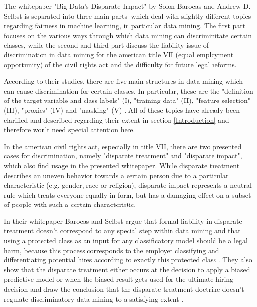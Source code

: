 The whitepaper "Big Data’s Disparate Impact" \cite{Barocas.2016} by Solon Barocas and 
Andrew D. Selbst is separated into three main parts, which deal with slightly different 
topics regarding fairness in machine learning, in particular data mining. The first part 
focuses on the various ways through which data mining can discriminitate certain classes, 
while the second and third part discuss the liability issue of discrimination in data 
mining for the american title VII (equal employment opportunity) \cite{titleVII} of the 
civil rights act and the difficulty for future legal reforms.  

According to their studies, there are five main structures in data mining which can 
cause discrimination for certain classes. In particular, these are the "definition of 
the target variable and class labels" (I), "training data" (II), "feature selection" (III), 
"proxies" (IV) and "masking" (V) \cite{Barocas.2016}. All of these topics have already 
been clarified and described regarding their extent in section \ref{Introduction} and 
therefore won't need special attention here.

In the american civil rights act, especially in title VII, there are two presented cases 
for discrimination, namely "disparate treatment" and "disparate impact", which also find 
usage in the presented whitepaper. While disparate treatment describes an uneven behavior 
towards a certain person due to a particular characteristic (e.g. gender, race or 
religion), disparate impact represents a neutral rule which treats everyone equally in 
form, but has a damaging effect on a subset of people with such a certain characteristic.

In their whitepaper Barocas and Selbst argue that formal liability in disparate treatment 
doesn't correspond to any special step within data mining and that using a protected 
class as an input for any classificatory model should be a legal harm, because this 
process corresponds to the employer classifying and differentiating potential hires 
according to exactly this protected class \cite{Barocas.2016}. They also show that the 
disparate treatment either occurs at the decision to apply  a biased predictive model 
or when the biased result gets used for the ultimate hiring decision and draw the 
conclusion that the disparate treatment doctrine doesn't regulate discriminatory 
data mining to a satisfying extent \cite{Barocas.2016}. 

